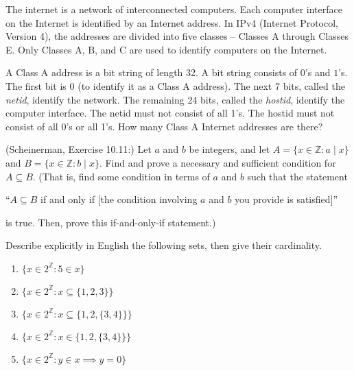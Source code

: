 \documentclass{article}
\theoremstyle{definition}
\begin{document}
\begin{question}
    The internet is a network of interconnected computers. Each computer interface on the Internet is identified by an Internet address. In IPv4 (Internet Protocol, Version 4), the addresses are divided into five classes -- Classes A through Classes E. Only Classes A, B, and C are used to identify computers on the Internet.
    
    A Class A address is a bit string of length 32. A bit string consists of $0$'s and $1$'s. The first bit is 0 (to identify it as a Class A address). The next 7 bits, called the \textit{netid}, identify the network. The remaining 24 bits, called the \textit{hostid}, identify the computer interface. The netid must not consist of all 1's. The hostid must not consist of all 0's or all 1's. How many Class A Internet addresses are there?
\end{question}
\begin{solution}
\end{solution}


\begin{question}
   (Scheinerman, Exercise 10.11:)
   Let $a$ and $b$ be integers, and let 
   $A = \{ x \in \mathbb{Z} : a \mid x\}$ and 
   $B = \{ x \in \mathbb{Z} : b \mid x\}$.  
   Find and prove a necessary and sufficient condition for $A \subseteq B$.
   (That is, find some condition in terms of $a$ and $b$ such that the statement
   \begin{center}
      ``$A \subseteq B$ if and only if [the condition involving $a$ and $b$ you provide is satisfied]''
   \end{center}
   is true.  Then, prove this if-and-only-if statement.)
\end{question}
\begin{solution}
\end{solution}

\begin{question}
Describe explicitly in English the following sets, then give their cardinality.

\begin{enumerate}
	\item $\{x \in 2^{\mathbb{Z}} : 5 \in x \}$
	\item $\{x \in 2^{\mathbb{Z}} : x \subseteq \{ 1, 2, 3\} \}$
	\item $\{x \in 2^{\mathbb{Z}} : x \subseteq \{ 1, 2, \{3, 4\} \} \}$
	\item $\{x \in 2^{\mathbb{Z}} : x \in \{ 1, 2, \{3, 4\} \} \}$
	\item $\{x \in 2^{\mathbb{Z}} : y \in x \implies y = 0 \}$
\end{enumerate}
\end{question}
\begin{solution}
\end{solution}
\end{document}
